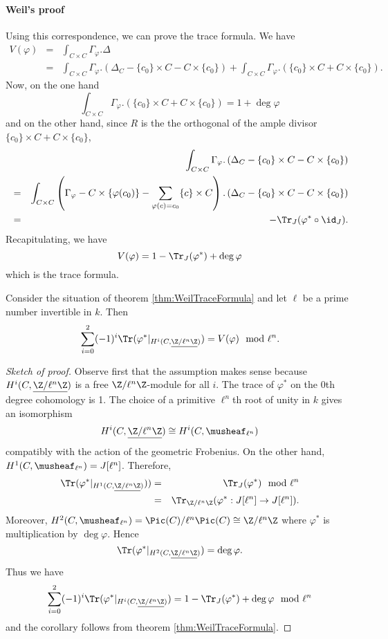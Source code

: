 \paragraph{Weil's proof} Using this correspondence, we can prove the trace formula. We have
\begin{eqnarray*}
V(\varphi) & = & \int_{C\times C} \Gamma_\varphi.\Delta \\
& = & \int_{C\times C} \Gamma_\varphi. \left(\Delta_C - \{c_0\} \times C - C \times \{c_0\}\right) + \int_{C\times C} \Gamma_\varphi. \left(\{c_0\} \times C + C \times \{c_0\}\right).
\end{eqnarray*}
Now, on the one hand
$$
\int_{C\times C} \Gamma_\varphi. \left(\{c_0\} \times C + C \times \{c_0\}\right) 
= 
1 + \deg \varphi
$$
and on the other hand, since $R$ is the the orthogonal of the ample divisor $\{c_0\} \times C + C \times \{c_0\}$,
\begin{eqnarray*}
&&
\int_{C\times C} \Gamma_\varphi. \left(\Delta_C - \{c_0\} \times C - C \times \{c_0\}\right) \\
& = &
\int_{C\times C} \left(\Gamma_\varphi - C \times \{\varphi(c_0)\} - \sum_{\varphi(c) = c_0} \{c\} \times C \right). \left(\Delta_C - \{c_0\} \times C - C \times \{c_0\}\right) \\
& = & - \Tr_J (\varphi^* \circ \id_J).
\end{eqnarray*}
Recapitulating, we have
$$
V(\varphi) = 1  - \Tr_J (\varphi^*) + \deg \varphi
$$
which is the trace formula.

\begin{cor}
Consider the situation of theorem \ref{thm:WeilTraceFormula} and let $\ell$ be a prime number invertible in $k$. Then
$$
\sum_{i=0}^2 (-1)^i \Tr(\varphi^* |_{H^i (C, \underline{\Z/\ell^n \Z})}) = V(\varphi) \mod \ell^n.
$$
\end{cor}

\begin{proof}[Sketch of proof]
Observe first that the assumption makes sense because $H^i(C, \underline{\Z/\ell^n \Z})$ is a free $\Z/\ell^n \Z$-module for all $i$. The trace of $\varphi^*$ on the 0th degree cohomology is 1. The choice of a primitive $\ell^n$th root of unity in $k$ gives an isomorphism
$$
H^i(C,\underline{\Z/\ell^n \Z}) \cong H^i(C,\musheaf_{\ell^n})
$$
compatibly with the action of the geometric Frobenius. On the other hand, $H^1(C,\musheaf_{\ell^n}) = J[\ell^n]$. Therefore,
\begin{eqnarray*}
\Tr(\varphi^* |_{H^1 (C, \underline{\Z/\ell^n \Z})})) & = & \Tr_J (\varphi^*) \mod \ell^n \\
& = & \Tr_{\Z/\ell^n \Z} (\varphi^* : J[\ell^n] \to J[\ell^n]).
\end{eqnarray*}
Moreover, $H^2(C,\musheaf_{\ell^n}) = \Pic(C)/\ell^n\Pic(C) \cong \Z/\ell^n \Z$ where $\varphi^*$ is multiplication by $\deg \varphi$. Hence
$$
\Tr (\varphi^*|_{H^2 (C, \underline{\Z/\ell^n \Z})}) = \deg \varphi.
$$
Thus we have 
$$
\sum_{i=0}^2 (-1)^i \Tr(\varphi^* |_{H^i (C, \underline{\Z/\ell^n \Z})}) = 1 - \Tr_J(\varphi^*) + \deg \varphi \mod \ell^n
$$
and the corollary follows from theorem \ref{thm:WeilTraceFormula}.
\end{proof}

